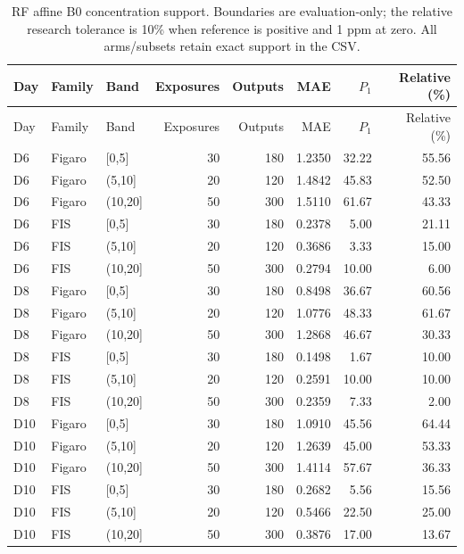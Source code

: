 \small\setlength{\tabcolsep}{4pt}
\begin{longtable}{lllrrrrr}
\caption{RF affine B0 concentration support. Boundaries are evaluation-only; the relative research tolerance is 10\% when reference is positive and 1 ppm at zero. All arms/subsets retain exact support in the CSV.}\label{tab:s_support}\\
\toprule
Day & Family & Band & Exposures & Outputs & MAE & $P_1$ & Relative (\%) \\ \midrule\endfirsthead
\toprule
Day & Family & Band & Exposures & Outputs & MAE & $P_1$ & Relative (\%) \\ \midrule\endhead
\bottomrule\endfoot
D6 & Figaro & [0,5] & 30 & 180 & 1.2350 & 32.22 & 55.56 \\
D6 & Figaro & (5,10] & 20 & 120 & 1.4842 & 45.83 & 52.50 \\
D6 & Figaro & (10,20] & 50 & 300 & 1.5110 & 61.67 & 43.33 \\
D6 & FIS & [0,5] & 30 & 180 & 0.2378 & 5.00 & 21.11 \\
D6 & FIS & (5,10] & 20 & 120 & 0.3686 & 3.33 & 15.00 \\
D6 & FIS & (10,20] & 50 & 300 & 0.2794 & 10.00 & 6.00 \\
D8 & Figaro & [0,5] & 30 & 180 & 0.8498 & 36.67 & 60.56 \\
D8 & Figaro & (5,10] & 20 & 120 & 1.0776 & 48.33 & 61.67 \\
D8 & Figaro & (10,20] & 50 & 300 & 1.2868 & 46.67 & 30.33 \\
D8 & FIS & [0,5] & 30 & 180 & 0.1498 & 1.67 & 10.00 \\
D8 & FIS & (5,10] & 20 & 120 & 0.2591 & 10.00 & 10.00 \\
D8 & FIS & (10,20] & 50 & 300 & 0.2359 & 7.33 & 2.00 \\
D10 & Figaro & [0,5] & 30 & 180 & 1.0910 & 45.56 & 64.44 \\
D10 & Figaro & (5,10] & 20 & 120 & 1.2639 & 45.00 & 53.33 \\
D10 & Figaro & (10,20] & 50 & 300 & 1.4114 & 57.67 & 36.33 \\
D10 & FIS & [0,5] & 30 & 180 & 0.2682 & 5.56 & 15.56 \\
D10 & FIS & (5,10] & 20 & 120 & 0.5466 & 22.50 & 25.00 \\
D10 & FIS & (10,20] & 50 & 300 & 0.3876 & 17.00 & 13.67 \\
\end{longtable}\normalsize
